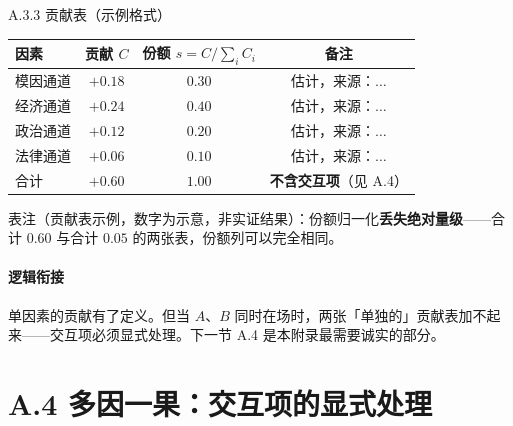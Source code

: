 \documentclass[../../main2.tex]{subfiles}
\begin{document}
	\begin{mathbox}{A.3.3 贡献表（示例格式）}
		\begin{center}
		\begin{tabular}{lccc}
			\toprule
			因素 & 贡献 $C$ & 份额 $s = C / \sum_i C_i$ & 备注 \\
			\midrule
			模因通道 & $+0.18$ & $0.30$ & 估计，来源：$\ldots$ \\
			经济通道 & $+0.24$ & $0.40$ & 估计，来源：$\ldots$ \\
			政治通道 & $+0.12$ & $0.20$ & 估计，来源：$\ldots$ \\
			法律通道 & $+0.06$ & $0.10$ & 估计，来源：$\ldots$ \\
			\midrule
			合计 & $+0.60$ & $1.00$ & \textbf{不含交互项}（见 A.4） \\
			\bottomrule
		\end{tabular}

		{\small 表注（贡献表示例，数字为示意，非实证结果）：份额归一化\textbf{丢失绝对量级}——合计 $0.60$ 与合计 $0.05$ 的两张表，份额列可以完全相同。}
		\end{center}
	\end{mathbox}

	\paragraph*{逻辑衔接}
	单因素的贡献有了定义。但当 $A$、$B$ 同时在场时，两张「单独的」贡献表加不起来——交互项必须显式处理。下一节 A.4 是本附录最需要诚实的部分。

	\section{A.4 多因一果：交互项的显式处理}
	\label{app:interaction}

\end{document}
